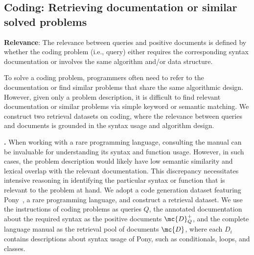 \subsection{Coding: Retrieving documentation or similar solved problems}
\begin{relevance}
\textbf{Relevance}: The relevance between queries and positive documents is defined by whether the coding problem (i.e., query) either requires the corresponding syntax documentation or involves the same algorithm and/or data structure.
\end{relevance}

\label{sec:code}
To solve a coding problem, programmers often need to refer to the documentation or find similar problems that share the same algorithmic design.
However, given only a problem description, it is difficult to find relevant documentation or similar problems via simple keyword or semantic matching. We construct two retrieval datasets on coding, where the relevance between queries and documents is grounded in the syntax usage and algorithm design. 


\textbf{\pony.}
When working with a rare programming language, consulting the manual can be invaluable for understanding its syntax and function usage.
However, in such cases, the problem description would likely have low semantic similarity and lexical overlap with the relevant documentation. 
This discrepancy necessitates intensive reasoning in identifying the particular syntax or function that is relevant to the problem at hand. 
We adopt a code generation dataset featuring Pony~\citep{su2024arks}, a rare programming language, and construct a retrieval dataset.
We use the instructions of coding problems as queries $Q$, the annotated documentation about the required syntax as the positive documents $\mc{D}^+_Q$, and the complete language manual as the retrieval pool of documents $\mc{D}$, where each $D_i$ contains descriptions about syntax usage of Pony, such as conditionals, loops, and classes. 

